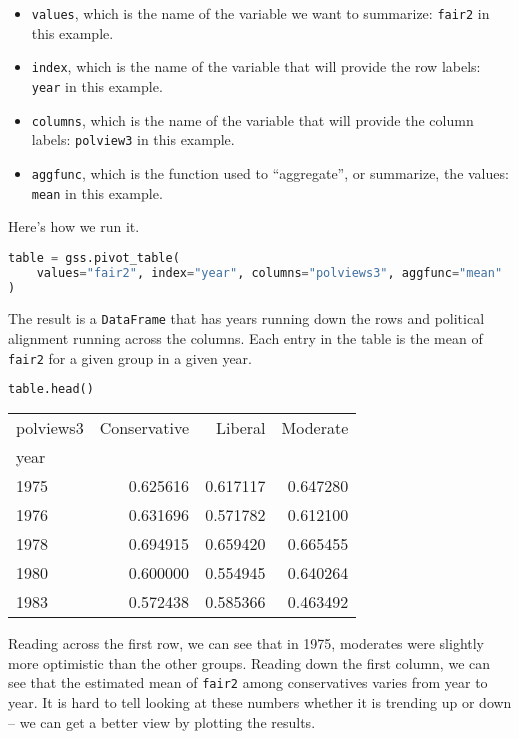 \begin{itemize}
\item
  \passthrough{\lstinline!values!}, which is the name of the variable we
  want to summarize: \passthrough{\lstinline!fair2!} in this example.
\item
  \passthrough{\lstinline!index!}, which is the name of the variable
  that will provide the row labels: \passthrough{\lstinline!year!} in
  this example.
\item
  \passthrough{\lstinline!columns!}, which is the name of the variable
  that will provide the column labels:
  \passthrough{\lstinline!polview3!} in this example.
\item
  \passthrough{\lstinline!aggfunc!}, which is the function used to
  ``aggregate'', or summarize, the values:
  \passthrough{\lstinline!mean!} in this example.
\end{itemize}

Here's how we run it.

\begin{lstlisting}[language=Python,style=source]
table = gss.pivot_table(
    values="fair2", index="year", columns="polviews3", aggfunc="mean"
)
\end{lstlisting}

The result is a \passthrough{\lstinline!DataFrame!} that has years
running down the rows and political alignment running across the
columns. Each entry in the table is the mean of
\passthrough{\lstinline!fair2!} for a given group in a given year.

\begin{lstlisting}[language=Python,style=source]
table.head()
\end{lstlisting}

\begin{tabular}{lrrr}
\midrule
polviews3 & Conservative & Liberal & Moderate \\
year &  &  &  \\
\midrule
1975 & 0.625616 & 0.617117 & 0.647280 \\
1976 & 0.631696 & 0.571782 & 0.612100 \\
1978 & 0.694915 & 0.659420 & 0.665455 \\
1980 & 0.600000 & 0.554945 & 0.640264 \\
1983 & 0.572438 & 0.585366 & 0.463492 \\
\midrule
\end{tabular}

Reading across the first row, we can see that in 1975, moderates were
slightly more optimistic than the other groups. Reading down the first
column, we can see that the estimated mean of
\passthrough{\lstinline!fair2!} among conservatives varies from year to
year. It is hard to tell looking at these numbers whether it is trending
up or down -- we can get a better view by plotting the results.

